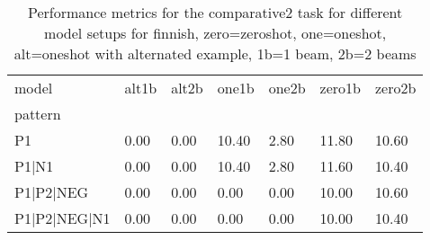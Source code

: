 \begin{table}[h]
\begin{tabular}{l|llllll}
\toprule
model & alt1b & alt2b & one1b & one2b & zero1b & zero2b \\
pattern &  &  &  &  &  &  \\
\midrule
P1 & 0.00 & 0.00 & 10.40 & 2.80 & 11.80 & 10.60 \\
P1|N1 & 0.00 & 0.00 & 10.40 & 2.80 & 11.60 & 10.40 \\
P1|P2|NEG & 0.00 & 0.00 & 0.00 & 0.00 & 10.00 & 10.60 \\
P1|P2|NEG|N1 & 0.00 & 0.00 & 0.00 & 0.00 & 10.00 & 10.40 \\
\bottomrule
\end{tabular}
\caption{Performance metrics for the comparative2 task for different model setups for finnish, zero=zeroshot, one=oneshot, alt=oneshot with alternated example, 1b=1 beam, 2b=2 beams}
\label{tab:fi_comparative2_performance}
\end{table}
